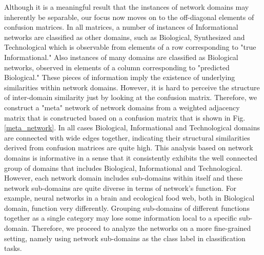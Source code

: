 \documentclass{article}
\begin{document}
Although it is a meaningful result that the instances of network domains may inherently be separable, our focus now moves on to the off-diagonal elements of confusion matrices. In all matrices, a number of instances of Informational networks are classified as other domains, such as Biological, Synthesized and Technological which is observable from elements of a row corresponding to  "true Informational." Also instances of many domains are classified as Biological networks, observed in elements of a column corresponding to "predicted Biological." These pieces of information imply the existence of underlying similarities within network domains. However, it is hard to perceive the structure of inter-domain similarity just by looking at the confusion matrix. Therefore, we construct a "meta" network of network domains from a weighted adjacency matrix that is constructed based on a confusion matrix that is shown in Fig.\ref{meta_network}. In all cases Biological, Informational and Technological domains are connected with wide edges together, indicating their structural similarities derived from confusion matrices are quite high. This analysis based on network domains is informative in a sense that it consistently exhibits the well connected group of domains that includes Biological, Informational and Technological. However, each network domain includes sub-domains within itself and these network sub-domains are quite diverse in terms of network's function. For example, neural networks in a brain and ecological food web, both in Biological domain, function very differently. Grouping sub-domains of different functions together as a single category may lose some information local to a specific sub-domain. Therefore, we proceed to analyze the networks on a more fine-grained setting, namely using network sub-domains as the class label in classification tasks.
 
\end{document}
